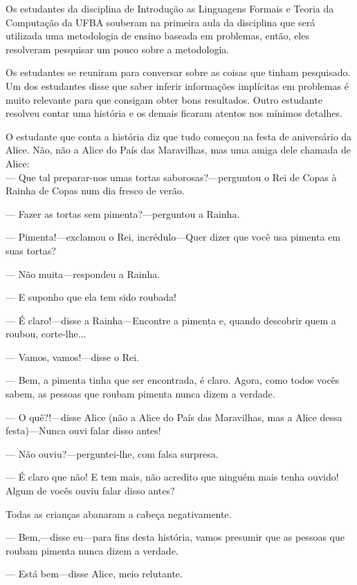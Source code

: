 Os estudantes da disciplina de Introdução as Linguagens Formais e Teoria da Computação da UFBA
souberam na primeira aula da disciplina que será utilizada uma metodologia de ensino baseada
em problemas, então, eles resolveram pesquisar um pouco sobre a metodologia.

Os estudantes se reuniram para conversar sobre as coisas que tinham pesquisado.
Um dos estudantes disse que saber inferir informações implícitas em problemas é muito relevante
para que consigam obter bons resultados.
Outro estudante resolveu contar uma história e os demais ficaram atentos nos mínimos detalhes.

O estudante que conta a história diz que tudo começou na festa de aniversário da Alice.
Não, não a Alice do País das Maravilhas, mas uma amiga dele chamada de Alice:\\

--- Que tal preparar-nos umas tortas saborosas?---perguntou o Rei de Copas à Rainha de Copas num dia fresco de verão.

--- Fazer as tortas sem pimenta?---perguntou a Rainha.

--- Pimenta!---exclamou o Rei, incrédulo---Quer dizer que você usa pimenta em suas tortas?

--- Não muita---respondeu a Rainha.

--- E suponho que ela tem sido roubada!

--- É claro!---disse a Rainha---Encontre a pimenta e, quando descobrir quem a roubou, corte-lhe...

--- Vamos, vamos!---disse o Rei.

--- Bem, a pimenta tinha que ser encontrada, é claro. Agora, como todos vocês sabem, as pessoas que roubam pimenta nunca dizem a verdade.

--- O quê?!---disse Alice (não a Alice do País das Maravilhas, mas a Alice dessa festa)---Nunca ouvi falar disso antes!

--- Não ouviu?---perguntei-lhe, com falsa surpresa.

--- É claro que não! E tem mais, não acredito que ninguém mais tenha ouvido! Algum de vocês ouviu falar disso antes?

Todas as crianças abanaram a cabeça negativamente.

--- Bem,---disse eu---para fins desta história, vamos presumir que as pessoas que roubam pimenta nunca dizem a verdade.

--- Está bem---disse Alice, meio relutante.

